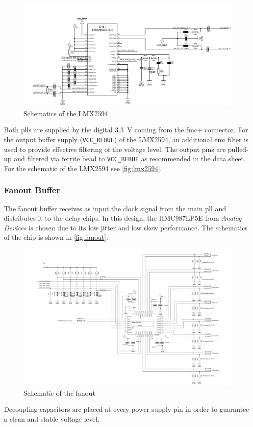 \begin{figure}[tbh]
	\centering
	\includegraphics[width = \textwidth]{chap/04-theresa/img/schematic/lmx2594}
	\caption{Schematics of the LMX2594}
	\label{fig:lmx2594}
\end{figure}

Both \glspl{pll} are supplied by the digital \SI{3.3}{\volt} coming from the \gls{fmc}+ connector.
For the output buffer supply (\texttt{VCC\_RFBUF}) of the LMX2594, an additional \gls{emi} filter is used to provide effective filtering of the voltage level.
The output pins are pulled-up and filtered via ferrite bead to \texttt{VCC\_RFBUF} as recommended in the data sheet.
For the schematic of the LMX2594 see \autoref{fig:lmx2594}.

\subsubsection*{Fanout Buffer}
The fanout buffer receives as input the clock signal from the main \gls{pll} and distributes it to the delay chips.
In this design, the HMC987LP5E from \textit{Analog Devices} is chosen due to its low jitter and low skew performance. 
The schematics of the chip is shown in \autoref{fig:fanout}.

\begin{figure}[tbh]
	\centering
	\includegraphics[width = \textwidth]{chap/04-theresa/img/schematic/fanout}
	\caption{Schematic of the fanout}
	\label{fig:fanout}
\end{figure}
Decoupling capacitors are placed at every power supply pin in order to guarantee a clean and stable voltage level.

